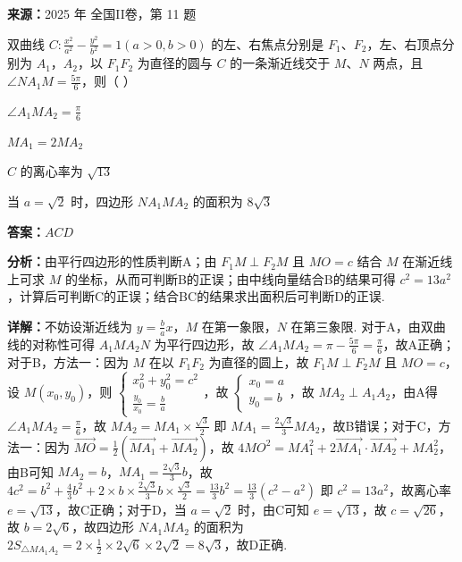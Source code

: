 \begin{question}[points=6]
\textbf{来源：}2025 年 全国II卷，第 11 题\par
双曲线 $C:\frac{x^2}{a^2}-\frac{y^2}{b^2}=1(a>0,b>0)$ 的左、右焦点分别是 $F_1$、$F_2$，左、右顶点分别为 $A_1$，$A_2$，以 $F_1F_2$ 为直径的圆与 $C$ 的一条渐近线交于 $M$、$N$ 两点，且 $\angle NA_1M=\frac{5\pi}{6}$，则（ ）
\begin{choices}
  \item $\angle A_1MA_2=\frac{\pi}{6}$
  \item $MA_1=2MA_2$
  \item $C$ 的离心率为 $\sqrt{13}$
  \item 当 $a=\sqrt{2}$ 时，四边形 $NA_1MA_2$ 的面积为 $8\sqrt{3}$
\end{choices}
\begin{solution}
\textbf{答案：}$ACD$

\textbf{分析：}由平行四边形的性质判断A；由 $F_1M\perp F_2M$ 且 $MO=c$ 结合 $M$ 在渐近线上可求 $M$ 的坐标，从而可判断B的正误；由中线向量结合B的结果可得 $c^2=13a^2$，计算后可判断C的正误；结合BC的结果求出面积后可判断D的正误.

\textbf{详解：}不妨设渐近线为 $y=\frac{b}{a}x$，$M$ 在第一象限，$N$ 在第三象限. 对于A，由双曲线的对称性可得 $A_1MA_2N$ 为平行四边形，故 $\angle A_1MA_2=\pi-\frac{5\pi}{6}=\frac{\pi}{6}$，故A正确；对于B，方法一：因为 $M$ 在以 $F_1F_2$ 为直径的圆上，故 $F_1M\perp F_2M$ 且 $MO=c$，设 $M(x_0,y_0)$，则 $\begin{cases}x_0^2+y_0^2=c^2\\\frac{y_0}{x_0}=\frac{b}{a}\end{cases}$，故 $\begin{cases}x_0=a\\y_0=b\end{cases}$，故 $MA_2\perp A_1A_2$，由A得 $\angle A_1MA_2=\frac{\pi}{6}$，故 $MA_2=MA_1\times\frac{\sqrt{3}}{2}$ 即 $MA_1=\frac{2\sqrt{3}}{3}MA_2$，故B错误；对于C，方法一：因为 $\overrightarrow{MO}=\frac{1}{2}(\overrightarrow{MA_1}+\overrightarrow{MA_2})$，故 $4MO^2=MA_1^2+2\overrightarrow{MA_1}\cdot\overrightarrow{MA_2}+MA_2^2$，由B可知 $MA_2=b$，$MA_1=\frac{2\sqrt{3}}{3}b$，故 $4c^2=b^2+\frac{4}{3}b^2+2\times b\times\frac{2\sqrt{3}}{3}b\times\frac{\sqrt{3}}{2}=\frac{13}{3}b^2=\frac{13}{3}(c^2-a^2)$ 即 $c^2=13a^2$，故离心率 $e=\sqrt{13}$，故C正确；对于D，当 $a=\sqrt{2}$ 时，由C可知 $e=\sqrt{13}$，故 $c=\sqrt{26}$，故 $b=2\sqrt{6}$，故四边形 $NA_1MA_2$ 的面积为 $2S_{\triangle MA_1A_2}=2\times\frac{1}{2}\times2\sqrt{6}\times2\sqrt{2}=8\sqrt{3}$，故D正确.
\end{solution}
\end{question}

